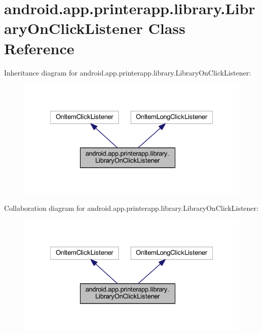 \hypertarget{classandroid_1_1app_1_1printerapp_1_1library_1_1_library_on_click_listener}{}\section{android.\+app.\+printerapp.\+library.\+Library\+On\+Click\+Listener Class Reference}
\label{classandroid_1_1app_1_1printerapp_1_1library_1_1_library_on_click_listener}


Inheritance diagram for android.\+app.\+printerapp.\+library.\+Library\+On\+Click\+Listener\+:
\nopagebreak
\begin{figure}[H]
\begin{center}
\leavevmode
\includegraphics[width=328pt]{classandroid_1_1app_1_1printerapp_1_1library_1_1_library_on_click_listener__inherit__graph}
\end{center}
\end{figure}


Collaboration diagram for android.\+app.\+printerapp.\+library.\+Library\+On\+Click\+Listener\+:
\nopagebreak
\begin{figure}[H]
\begin{center}
\leavevmode
\includegraphics[width=328pt]{classandroid_1_1app_1_1printerapp_1_1library_1_1_library_on_click_listener__coll__graph}
\end{center}
\end{figure}
